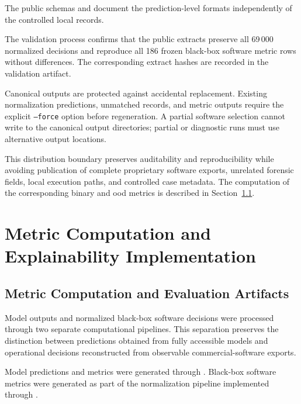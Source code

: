 The public schemas
 and
document the prediction-level formats independently of the controlled local
records.

The validation process confirms that the public extracts preserve all 69\,000
normalized decisions and reproduce all 186 frozen black-box software metric
rows without differences. The corresponding extract hashes are recorded in the
validation artifact.

Canonical outputs are protected against accidental replacement. Existing
normalization predictions, unmatched records, and metric outputs require the
explicit \texttt{--force} option before regeneration. A partial software
selection cannot write to the canonical output directories; partial or
diagnostic runs must use alternative output locations.

This distribution boundary preserves auditability and reproducibility while
avoiding publication of complete proprietary software exports, unrelated
forensic fields, local execution paths, and controlled case metadata. The
computation of the corresponding binary and \gls{ood} metrics is described in
Section~\ref{subsec:implementation-metrics}.


\section{Metric Computation and Explainability Implementation}
\label{sec:implementation-analysis}
\subsection{Metric Computation and Evaluation Artifacts}
\label{subsec:implementation-metrics}

Model outputs and normalized black-box software decisions were processed
through two separate computational pipelines. This separation preserves the
distinction between predictions obtained from fully accessible models and
operational decisions reconstructed from observable commercial-software
exports.

Model predictions and metrics were generated through
. Black-box software
metrics were generated as part of the normalization pipeline implemented
through
.

